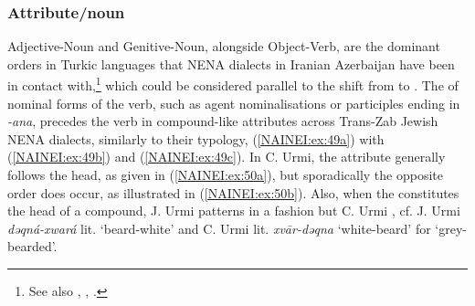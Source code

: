 \documentclass[output=paper,colorlinks,citecolor=brown,draftmode]{langscibook}
\begin{document}
\subsubsection{Attribute/noun}\label{NAINEI:sec:3.2.5}
Adjective-Noun and Genitive-Noun, alongside Object-Verb, are the dominant orders in Turkic languages that NENA dialects in Iranian Azerbaijan have been in contact with,\footnote{See also \citet[171--172]{Garbell1065a}, \citet[39]{Khan2016CUrmi}, \citet[220--224, 332--334]{Gutman2018AttNENA}.} which could be considered parallel to the shift from  to  \citep[222, 233, 250--251]{Gutman2018AttNENA}. The  of nominal forms of the verb, such as agent nominalisations or participles ending in \textit{-ana}, precedes the verb in compound-like attributes across Trans-Zab Jewish NENA dialects, similarly to their  typology,  (\ref{NAINEI:ex:49a}) with (\ref{NAINEI:ex:49b}) and (\ref{NAINEI:ex:49c}). In C. Urmi, the attribute generally follows the head, as given in (\ref{NAINEI:ex:50a}), but sporadically the opposite order does occur, as illustrated in (\ref{NAINEI:ex:50b}). Also, when the  constitutes the head of a compound, J. Urmi patterns in a  fashion but C. Urmi , cf. J. Urmi \textit{dəqná-xwará} lit. `beard-white' and C. Urmi lit. \textit{xvār-dəqna} `white-beard' for `grey-bearded'.
\end{document}
